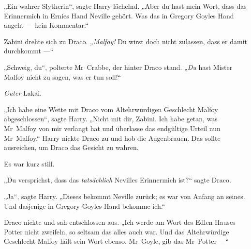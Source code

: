 „Ein wahrer Slytherin“, sagte Harry lächelnd.
„Aber du hast mein Wort, dass das Erinnermich in Ernies Hand Neville gehört. Was das in Gregory Goyles Hand angeht — kein Kommentar.“

Zabini drehte sich zu Draco.
„\emph{Malfoy!} Du wirst doch nicht zulassen, dass er damit durchkommt —“

„Schweig, du“, polterte Mr~Crabbe, der hinter Draco stand.
„\emph{Du} hast Mister Malfoy nicht zu sagen, was er tun soll!“

\emph{Guter} Lakai.

„Ich habe eine Wette mit Draco vom Altehrwürdigen Geschlecht Malfoy abgeschlossen“, sagte Harry.
„Nicht mit dir, Zabini. Ich habe getan, was Mr~Malfoy von mir verlangt hat und überlasse das endgültige Urteil nun Mr~Malfoy.“ Harry nickte Draco zu und hob die Augenbrauen. Das sollte ausreichen, um Draco das Gesicht zu wahren.

Es war kurz still.

„Du versprichst, dass das \emph{tatsächlich} Nevilles Erinnermich ist?“ sagte Draco.

„Ja“, sagte Harry.
„Dieses bekommt Neville zurück; es war von Anfang an seines. Und dasjenige in Gregory Goyles Hand bekomme ich.“

Draco nickte und sah entschlossen aus.
„Ich werde am Wort des Edlen Hauses Potter nicht zweifeln, so seltsam das alles auch war. Und das Altehrwürdige Geschlecht Malfoy hält sein Wort ebenso. Mr~Goyle, gib das Mr~Potter —“

